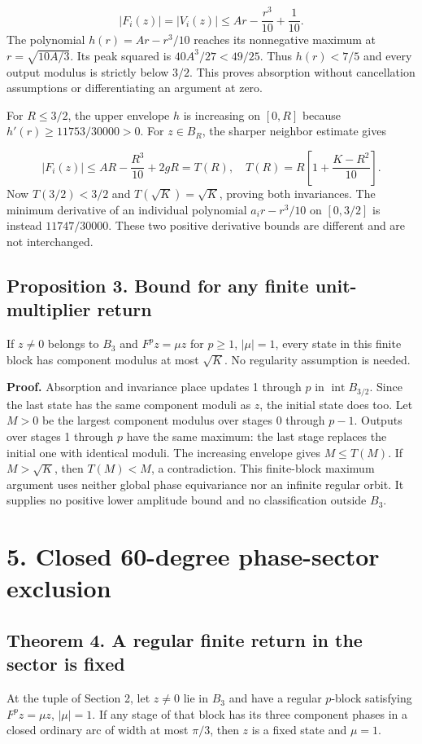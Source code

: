 \documentclass[11pt,a4paper]{article}
\begin{document}
\begin{equation}|F_i(z)|=|V_i(z)|\leq Ar-\frac{r^3}{10}+\frac{1}{10}.\end{equation}
The polynomial $h(r)=Ar-r^3/10$ reaches its nonnegative maximum at $r=\sqrt{10A/3}$. Its peak squared is $40A^3/27<49/25$. Thus $h(r)<7/5$ and every output modulus is strictly below $3/2$. This proves absorption without cancellation assumptions or differentiating an argument at zero.

For $R\leq3/2$, the upper envelope $h$ is increasing on $[0,R]$ because $h'(r)\geq11753/30000>0$. For $z\in B_R$, the sharper neighbor estimate gives

\begin{equation}|F_i(z)|\leq AR-\frac{R^3}{10}+2gR=T(R),\quad T(R)=R\left[1+\frac{K-R^2}{10}\right].\end{equation}
Now $T(3/2)<3/2$ and $T(\sqrt{K})=\sqrt{K}$, proving both invariances. The minimum derivative of an individual polynomial $a_i r-r^3/10$ on $[0,3/2]$ is instead $11747/30000$. These two positive derivative bounds are different and are not interchanged.

\subsection*{Proposition 3. Bound for any finite unit-multiplier return}
If $z\neq0$ belongs to $B_3$ and $F^p z=\mu z$ for $p\geq1$, $|\mu|=1$, every state in this finite block has component modulus at most $\sqrt{K}$. No regularity assumption is needed.

\textbf{Proof.} Absorption and invariance place updates 1 through $p$ in $\operatorname{int}B_{3/2}$. Since the last state has the same component moduli as $z$, the initial state does too. Let $M>0$ be the largest component modulus over stages 0 through $p-1$. Outputs over stages 1 through $p$ have the same maximum: the last stage replaces the initial one with identical moduli. The increasing envelope gives $M\leq T(M)$. If $M>\sqrt{K}$, then $T(M)<M$, a contradiction. This finite-block maximum argument uses neither global phase equivariance nor an infinite regular orbit. It supplies no positive lower amplitude bound and no classification outside $B_3$.

\clearpage
\section*{5. Closed 60-degree phase-sector exclusion}
\subsection*{Theorem 4. A regular finite return in the sector is fixed}
At the tuple of Section 2, let $z\neq0$ lie in $B_3$ and have a regular $p$-block satisfying $F^p z=\mu z$, $|\mu|=1$. If any stage of that block has its three component phases in a closed ordinary arc of width at most $\pi/3$, then $z$ is a fixed state and $\mu=1$.
\end{document}
